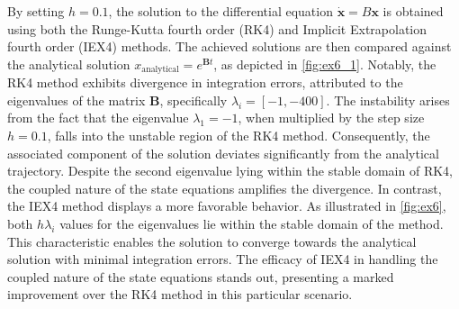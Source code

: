 \documentclass[11pt,a4paper,oneside]{article}
\renewcommand{\vec}[1]{\mathbf{#1}}
\begin{document}
By setting $h=0.1$, the solution to the differential equation $\dot{\vec x} = B \vec x$ 
is obtained using both the Runge-Kutta fourth order (RK4) and Implicit Extrapolation 
fourth order (IEX4) methods. The achieved solutions are then compared against the 
analytical solution $x_{\text{analytical}}=e^{\vec{B}t}$, as depicted in \autoref{fig:ex6_1}.
Notably, the RK4 method exhibits divergence in integration errors, attributed to the 
eigenvalues of the matrix $\vec{B}$, specifically $\lambda_i= [-1, -400]$. 
The instability arises from the fact that the eigenvalue $\lambda_1= -1$, 
when multiplied by the step size $h=0.1$, falls into the unstable region of 
the RK4 method. Consequently, the associated component of the solution deviates 
significantly from the analytical trajectory. Despite the second eigenvalue lying 
within the stable domain of RK4, the coupled nature of the state equations 
amplifies the divergence. In contrast, the IEX4 method displays a more favorable 
behavior. As illustrated in \autoref{fig:ex6}, both $h\lambda_i$ values for the 
eigenvalues lie within the stable domain of the method. This characteristic enables 
the solution to converge towards the analytical solution with minimal integration 
errors. The efficacy of IEX4 in handling the coupled nature of the state equations 
stands out, presenting a marked improvement over the RK4 method in this particular 
scenario.
\end{document}

